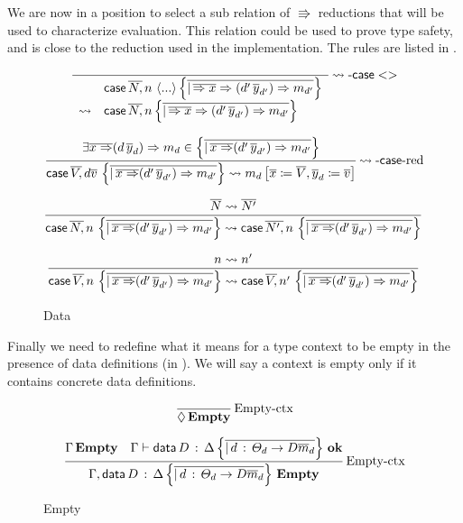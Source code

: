 We are now in a position to select a sub relation of $\Rrightarrow$ reductions that will be used to characterize \cbv{} evaluation.
This relation could be used to prove type safety, and is close to the reduction used in the implementation.
The rules are listed in .

\begin{figure}
\[
\frac{\,}{
  \begin{array}{rl}
   & \mathsf{case}{} \,\overline{N,}\,n\,\left\langle ...\right\rangle \left\{ \overline{|\,\overline{\Rightarrow x}\Rightarrow(d'\,\overline{y}_{d'})\Rightarrow m_{d'}}\right\} \\
   \rightsquigarrow & \mathsf{case}{} \,\overline{N,}\,n\left\{ \overline{|\,\overline{\Rightarrow x}\Rightarrow(d'\,\overline{y}_{d'})\Rightarrow m_{d'}}\right\} 
  \end{array}
   }\operatorname{\rightsquigarrow-\mathsf{case}{}<>}
\]

\[
\frac{\exists\overline{x\Rightarrow}(d\,\overline{y}_{d})\Rightarrow m_{d}\in\left\{ \overline{|\,\overline{x\Rightarrow}(d'\,\overline{y}_{d'})\Rightarrow m_{d'}}\right\} }{\mathsf{case}{} \,\overline{V,}\,d\overline{v}\,\left\{ \overline{|\,\overline{x\Rightarrow}(d'\,\overline{y}_{d'})\Rightarrow m_{d'}}\right\} \rightsquigarrow m_{d}\left[\overline{x}\coloneqq\overline{V},\overline{y}_{d}\coloneqq\overline{v}\right]
}\operatorname{\rightsquigarrow-\mathsf{case}{}-red}
\]

\[
\frac{\overline{N}\rightsquigarrow\overline{N'}}{\mathsf{case}{} \,\overline{N,}\,n\,\left\{ \overline{|\,\overline{x\Rightarrow}(d'\,\overline{y}_{d'})\Rightarrow m_{d'}}\right\} \rightsquigarrow \mathsf{case}{} \,\overline{N',}\,n\,\left\{ \overline{|\,\overline{x\Rightarrow}(d'\,\overline{y}_{d'})\Rightarrow m_{d'}}\right\} }\,
\]

\[
\frac{n\rightsquigarrow n'}{\mathsf{case}{} \,\overline{V,}\,n\,\left\{ \overline{|\,\overline{x\Rightarrow}(d'\,\overline{y}_{d'})\Rightarrow m_{d'}}\right\} \rightsquigarrow \mathsf{case}{} \,\overline{V,}\,n'\,\left\{ \overline{|\,\overline{x\Rightarrow}(d'\,\overline{y}_{d'})\Rightarrow m_{d'}}\right\} }\,
\]

\caption{\SLang{} Data \CbV{}}
\label{fig:surface-data-cbv}
\end{figure}

Finally we need to redefine what it means for a type context to be empty in the presence of data definitions (in ).
We will say a context is empty only if it contains concrete data definitions.

\begin{figure}
\[
\frac{\ }{\lozenge\,\mathbf{Empty}}\rulename{Empty-ctx}
\]

\[
\frac{\Gamma\,\mathbf{Empty}\quad\Gamma\vdash\mathsf{data}\,D\,:\,\Delta\left\{ \overline{|\,d\,:\,\varTheta_{d}\rightarrow D\overline{m}_{d}}\right\} \,\mathbf{ok}}{\Gamma,\mathsf{data}\,D\,:\,\Delta\left\{ \overline{|\,d\,:\,\varTheta_{d}\rightarrow D\overline{m}_{d}}\right\} \,\mathbf{Empty}}\operatorname{Empty-ctx}
\]

\caption{\SLang{} Empty}
\label{fig:surface-data-empty}
\end{figure}


